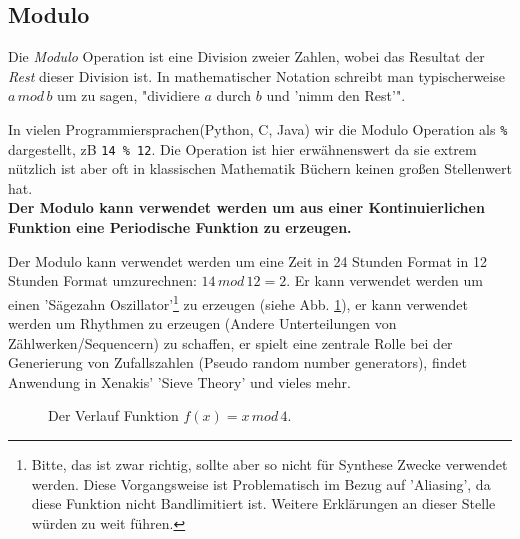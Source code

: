 

\subsection{Modulo}
Die \emph{Modulo} Operation ist eine Division zweier Zahlen, wobei das Resultat der \emph{Rest} dieser Division ist. In mathematischer Notation schreibt man typischerweise $a \, mod \, b$ um zu sagen, "dividiere $a$ durch $b$ und 'nimm den Rest'".

In vielen Programmiersprachen(Python, C, Java) wir die Modulo Operation als \texttt{\%} dargestellt, zB \texttt{14 \% 12}. Die Operation ist hier erwähnenswert da sie extrem nützlich ist aber oft in klassischen Mathematik Büchern keinen großen Stellenwert hat. \\
\textbf{Der Modulo kann verwendet werden um aus einer Kontinuierlichen Funktion eine Periodische Funktion zu erzeugen.}

Der Modulo kann verwendet werden um eine Zeit in 24 Stunden Format in 12 Stunden Format umzurechnen: $14 \, mod \, 12 = 2$. Er kann verwendet werden um einen 'Sägezahn Oszillator'\footnote{Bitte, das ist zwar richtig, sollte aber so nicht für Synthese Zwecke verwendet werden. Diese Vorgangsweise ist Problematisch im Bezug auf 'Aliasing', da diese Funktion nicht Bandlimitiert ist. Weitere Erklärungen an dieser Stelle würden zu weit führen.} zu erzeugen (siehe Abb. \ref{fig:modulo}), er kann verwendet werden um Rhythmen zu erzeugen (Andere Unterteilungen von Zählwerken/Sequencern) zu schaffen, er spielt eine zentrale Rolle bei der Generierung von Zufallszahlen (Pseudo random number generators), findet Anwendung in Xenakis' 'Sieve Theory' \citep{exarchos2011sieve}\citep{ariza2005xenakis} und vieles mehr.



\begin{figure}[H]
    \centering
    
    \caption{Der Verlauf Funktion $f(x) =  x \, mod \, 4$.}
    \label{fig:modulo}
\end{figure}


